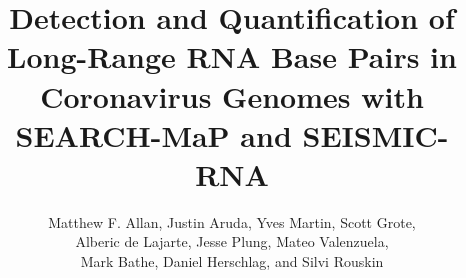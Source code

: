 \documentclass[12pt,a4paper]{article}
\title{Detection and Quantification of Long-Range RNA Base Pairs in Coronavirus Genomes with SEARCH-MaP and SEISMIC-RNA}
\author{Matthew F. Allan, Justin Aruda, Yves Martin, Scott Grote,\\ Alberic de Lajarte, Jesse Plung, Mateo Valenzuela,\\ Mark Bathe, Daniel Herschlag, and Silvi Rouskin}
\begin{document}
\sloppy

\maketitle
\newpage

\newpage

\newpage

%
\newpage

\newpage
\begin{singlespace}
	
	
\end{singlespace}
\end{document}

